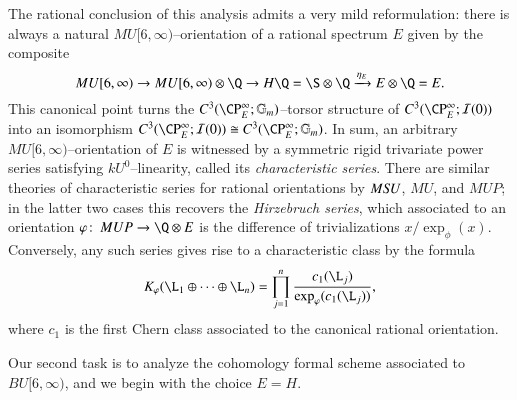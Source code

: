 \begin{remark}
The rational conclusion of this analysis admits a very mild reformulation: there is always a natural $MU[6, \infty)$--orientation of a rational spectrum $E$ given by the composite \[MU[6, \infty) \to MU[6, \infty) \otimes \Q \to H\Q = \S \otimes \Q \xrightarrow{\eta_E} E \otimes \Q = E.\]  This canonical point turns the $C^3(\CP^\infty_E; \Gm)$--torsor structure of $C^3(\CP^\infty_E; \sheaf I(0))$ into an isomorphism $C^3(\CP^\infty_E; \sheaf I(0)) \cong C^3(\CP^\infty_E; \Gm)$.  In sum, an arbitrary $MU[6, \infty)$--orientation of $E$ is witnessed by a symmetric rigid trivariate power series satisfying $kU^0$--linearity, called its \textit{characteristic series}.  There are similar theories of characteristic series for rational orientations by $M\mathit{SU}$, $MU$, and $MUP$; in the latter two cases this recovers the \textit{Hirzebruch series}, which associated to an orientation $\phi\co MUP \to \Q \otimes E$ is the difference of trivializations $x / \exp_\phi(x)$.  Conversely, any such series gives rise to a characteristic class by the formula \[K_\phi(\L_1 \oplus \cdots \oplus \L_n) = \prod_{j=1}^n \frac{c_1(\L_j)}{\exp_\phi(c_1(\L_j))},\] where $c_1$ is the first Chern class associated to the canonical rational orientation.
\end{remark}

Our second task is to analyze the cohomology formal scheme associated to $BU[6, \infty)$, and we begin with the choice $E = H$.

